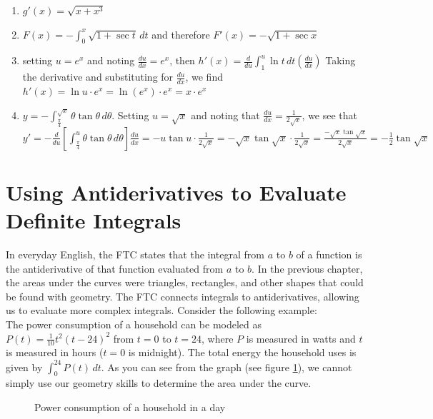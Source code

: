 \begin{Answer}[ref=FTC1]
	\begin{enumerate}
	\item $g'(x) = \sqrt{x + x^3}$
	\item $F(x) = - \int_0^x \sqrt{1+\sec{t}}\,dt$ and therefore $F'(x) = 
	- \sqrt{1+\sec{x}}$
	\item setting $u = e^x$ and noting $\frac{du}{dx} = e^x$, then $h'(x) 
	= \frac{d}{du}\int_1^{u} \ln{t}\,dt(\frac{du}{dx})$ Taking the 
	derivative and substituting for $\frac{du}{dx}$, we find $h'(x) = 
	\ln{u} \cdot e^x = \ln{(e^x)} \cdot e^x = x \cdot e^x$
	\item $y = - \int_{\frac{\pi}{4}}^{\sqrt{x}} \theta \tan{\theta}\,
	d\theta$. Setting $u = \sqrt{x}$ and noting that $\frac{du}{dx} = 
	\frac{1}{2\sqrt{x}}$, we see that $y' = -\frac{d}{du}
	[\int_{\frac{\pi}{4}}^{u}\theta\tan{\theta}\,d\theta]\frac{du}{dx} 
	= -u\tan{u} \cdot \frac{1}{2\sqrt{x}} = -\sqrt{x}\tan{\sqrt{x}} \cdot 
	\frac{1}{2\sqrt{x}} = \frac{-\sqrt{x}\tan{\sqrt{x}}}{2\sqrt{x}} = 
	- \frac{1}{2}\tan{\sqrt{x}}$
	\end{enumerate}
\end{Answer}

\section{Using Antiderivatives to Evaluate Definite Integrals}
In everyday English, the FTC states that the integral from $a$ to $b$ 
of a function is the antiderivative of that function evaluated from 
$a$ to $b$. In the previous chapter, the areas under the curves were triangles,
rectangles, and other shapes that could be found with geometry. The FTC connects integrals to antiderivatives, 
allowing us to evaluate more complex integrals. Consider the following 
example:\\

The power consumption of a household can be modeled as 
$P(t) = \frac{1}{10} t^2 (t - 24)^2$ from $t = 0$ to $t = 24$, where 
$P$ is measured in watts and $t$ is measured in hours ($t = 0$ is 
midnight). The total energy the household uses is given by $\int_{0}^{24} 
P(t)\,dt$. As you can see from the graph (see figure \ref{fig:power}), 
we cannot simply use our geometry skills to determine the area under 
the curve. 

\begin{figure}
	\caption{Power consumption of a household in a day}
	\label{fig:power}
\end{figure}


